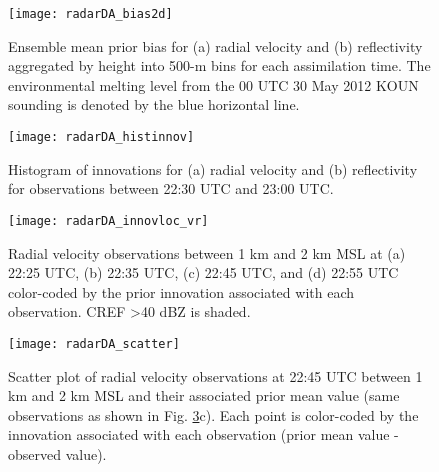 \begin{figure}
\centering
\texttt{[image: radarDA\_bias2d]}
\caption{Ensemble mean prior bias for (a) radial velocity and (b) reflectivity aggregated by height into 500-m bins for each assimilation time. The environmental melting level from the 00 UTC 30 May 2012 KOUN sounding is denoted by the blue horizontal line.}
\label{bias2d}
\end{figure}
\begin{figure}
\centering
\texttt{[image: radarDA\_histinnov]}
\caption{Histogram of innovations for (a) radial velocity and (b) reflectivity for observations between 22:30 UTC and 23:00 UTC.}
\label{histinnov}
\end{figure}
\begin{figure}
\centering
\texttt{[image: radarDA\_innovloc\_vr]}
\caption{Radial velocity observations between 1 km and 2 km MSL at (a) 22:25 UTC, (b) 22:35 UTC, (c) 22:45 UTC, and (d) 22:55 UTC color-coded by the prior innovation associated with each observation. CREF \textgreater 40 dBZ is shaded.}
\label{innovlocvr}
\end{figure}
\begin{figure}
\centering
\texttt{[image: radarDA\_scatter]}
\caption{Scatter plot of radial velocity observations at 22:45 UTC between 1 km and 2 km MSL and their associated prior mean value (same observations as shown in Fig. \ref{innovlocvr}c). Each point is color-coded by the innovation associated with each observation (prior mean value - observed value).}
\label{scatter}
\end{figure}

